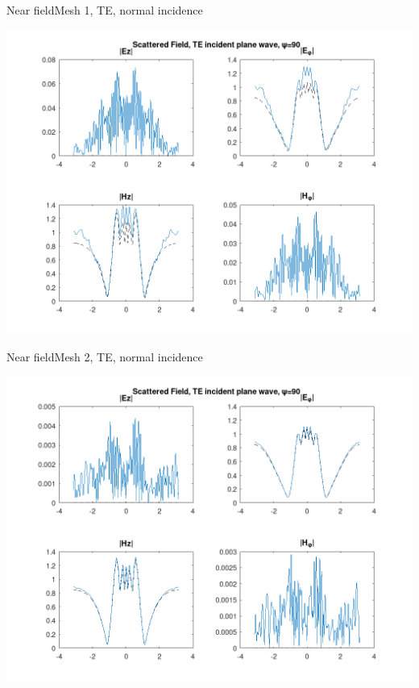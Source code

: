 
\begin{frame}{Near field}{Mesh 1, TE, normal incidence}

\includegraphics[width=0.95\linewidth]{results/pec_y_malla_gorda_90_TE/NF.png}
  
\end{frame}
  

\begin{frame}{Near field}{Mesh 2, TE, normal incidence}

\includegraphics[width=0.95\linewidth]{results/pec_y_malla_fina_90_TE/NF.png}
  
\end{frame}

